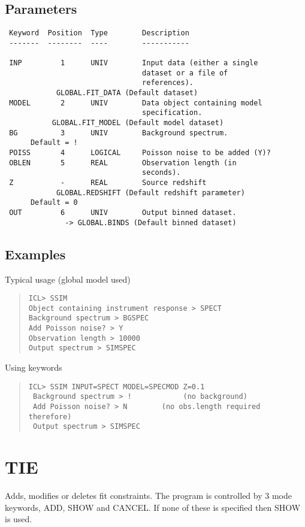 \documentclass{book}
\renewcommand{\_}{{\tt\char'137}}     %
\begin{document}
\subsection{Parameters}
\begin{verbatim}
 Keyword  Position  Type        Description
 -------  --------  ----        -----------

 INP         1      UNIV        Input data (either a single
                                dataset or a file of
                                references).
            GLOBAL.FIT_DATA (Default dataset)
 MODEL       2      UNIV        Data object containing model
                                specification.
           GLOBAL.FIT_MODEL (Default model dataset)
 BG          3      UNIV        Background spectrum.
      Default = !
 POISS       4      LOGICAL     Poisson noise to be added (Y)?
 OBLEN       5      REAL        Observation length (in
                                seconds).
 Z           -      REAL        Source redshift
            GLOBAL.REDSHIFT (Default redshift parameter)
      Default = 0
 OUT         6      UNIV        Output binned dataset.
              -> GLOBAL.BINDS (Default binned dataset)

\end{verbatim}\subsection{Examples}
Typical usage (global model used)
\begin{quote}\begin{verbatim}
ICL> SSIM
Object containing instrument response > SPECT
Background spectrum > BGSPEC
Add Poisson noise? > Y
Observation length > 10000
Output spectrum > SIMSPEC
\end{verbatim}\end{quote}
Using keywords
\begin{quote}\begin{verbatim}
ICL> SSIM INPUT=SPECT MODEL=SPECMOD Z=0.1
 Background spectrum > !            (no background)
 Add Poisson noise? > N        (no obs.length required therefore)
 Output spectrum > SIMSPEC
\end{verbatim}\end{quote}
\section{TIE}
Adds, modifies or deletes fit constraints. The program is controlled
by 3 mode keywords, ADD, SHOW and CANCEL. If none of these is specified
then SHOW is used.
\end{document}
